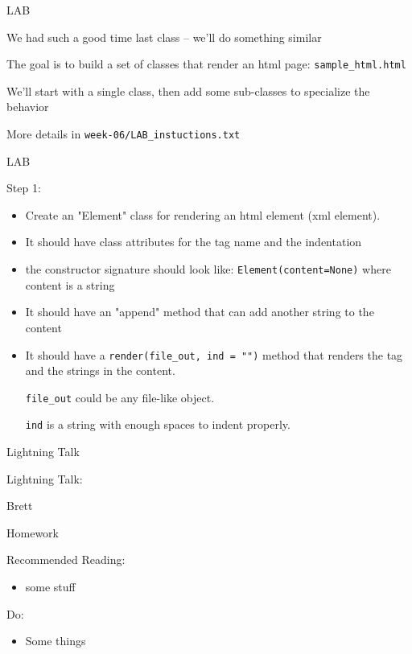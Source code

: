 \documentclass{beamer}
\begin{document}
\begin{frame}[fragile]{LAB}

\vfill
{\Large We had such a good time last class -- we'll do something similar}

\vfill
{\Large The goal is to build a set of classes that render an html page:
\verb|sample_html.html|
}

\vfill
{\Large We'll start with a single class, then add some sub-classes to specialize the behavior}

\vfill
More details in \verb+week-06/LAB_instuctions.txt+
\end{frame}

\begin{frame}[fragile]{LAB}

\vfill
{\Large Step 1:}

\begin{itemize}
  \item Create an "Element" class for rendering an html element (xml element). 
  \item It should have class attributes for the tag name  and the
  indentation
  \item the constructor signature should look like:
    \verb|Element(content=None)| where content is a string
  \item It should have an "append" method that can add another string to the content
  \item It should have a \verb|render(file_out, ind = "")| method that renders the tag
     and the strings in the content.

     \verb|file_out| could be any file-like object.

     \verb|ind| is a string with enough spaces to indent properly.
\end{itemize}

\end{frame}

\begin{frame}{Lightning Talk}

{\centering

\vfill
{\LARGE Lightning Talk:  }

\vfill
{\Huge Brett}

\vfill
}
\end{frame}



\begin{frame}[fragile]{Homework}

Recommended Reading:
\begin{itemize}
  \item some stuff
\end{itemize}

Do:
\begin{itemize}
    \item Some things    
\end{itemize}

\end{frame}
\end{document}
